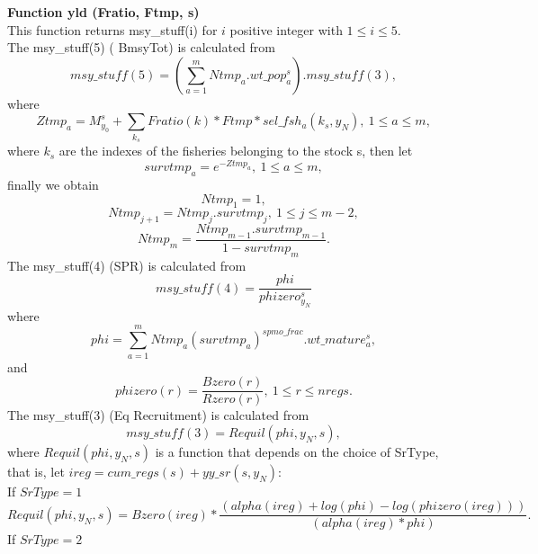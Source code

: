 \documentclass{article}
\begin{document}
\textbf{Function yld (Fratio, Ftmp, s)}\\

This function returns msy\_stuff(i) for $i$ positive integer with $1\leq i \leq 5$. \\
The msy\_stuff(5) ( BmsyTot) is calculated from
\begin{equation}
    msy\_stuff(5)=\left(\sum_{a=1}^m Ntmp_a.wt\_pop^s_a\right).msy\_stuff(3),
\end{equation}
where
\begin{equation}
    Ztmp_a=M^s_{y_0}+\sum_{k_s}Fratio(k)*Ftmp*sel\_fsh_a(k_s,y_N), \ 1\leq a \leq m, 
\end{equation}
where $k_s$ are the indexes of the fisheries belonging to the stock s, then let
\begin{equation}
    survtmp_a=e^{-Ztmp_a}, \ 1\leq a \leq m,
\end{equation}
finally we obtain
\begin{equation}
    Ntmp_1=1,
\end{equation}
\begin{equation}
    Ntmp_{j+1}=Ntmp_j.survtmp_j, \ 1\leq j \leq m-2,
\end{equation}
\begin{equation}
    Ntmp_m=\dfrac{Ntmp_{m-1}.survtmp_{m-1}}{1-survtmp_m}.
\end{equation}
The msy\_stuff(4) (SPR) is calculated from
\begin{equation}
    msy\_stuff(4)=\dfrac{phi}{phizero^s_{y_N}}
\end{equation}
where 
\begin{equation}
    phi= \sum_{a=1}^m Ntmp_a(survtmp_a)^{spmo\_frac}.wt\_mature^s_a,
\end{equation}
and 
\begin{equation}
    phizero(r)=\dfrac{Bzero(r)}{Rzero(r)}, \ 1\leq r \leq nregs.
\end{equation}
The msy\_stuff(3) (Eq Recruitment) is calculated from
\begin{equation}
    msy\_stuff(3)  = Requil(phi,y_N,s),
\end{equation}
where $Requil(phi,y_N,s)$ is a function that depends on the choice of SrType, that is, let $ireg=cum\_regs(s)+yy\_sr(s,y_N)$:\\
If $SrType=1$
\begin{equation}
    Requil(phi,y_N,s)=Bzero(ireg) * \dfrac{(alpha(ireg) + log(phi) - log(phizero(ireg)) )}  {(alpha(ireg)*phi)}.
\end{equation}
If $SrType=2$
\end{document}
